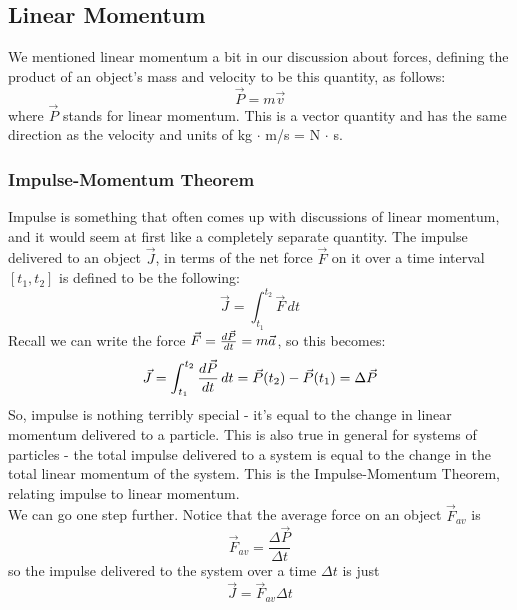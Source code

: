 \subsection{Linear Momentum}
We mentioned linear momentum a bit in our discussion about forces, defining the product of an object's mass and velocity to be this quantity, as follows: 
\[
	\vec P = m \vec v
\]
where $\vec P$ stands for linear momentum. This is a vector quantity and has the same direction as the velocity and units of kg $\cdot$ m/s = N $\cdot$ s. 
\subsubsection{Impulse-Momentum Theorem}
Impulse is something that often comes up with discussions of linear momentum, and it would seem at first like a completely separate quantity. The impulse delivered to an object $\vec J$, in terms of the net force $\vec F$ on it over a time interval $[t_1, t_2]$ is defined to be the following: 
\[
	\vec J = \int_{t_1}^{t_2} \vec F \, dt
\]
Recall we can write the force $\vec F = \frac{d \vec P}{d t} = m \vec a$, so this becomes:
\[
	\vec J = \int_{t_1}^{t_2} \frac{d \vec P}{d t} \, dt = \vec P(t_2) - \vec P(t_1) = \Delta \vec P
\]
So, impulse is nothing terribly special - it's equal to the change in linear momentum delivered to a particle. This is also true in general for systems of particles - the total impulse delivered to a system is equal to the change in the total linear momentum of the system. This is the Impulse-Momentum Theorem, relating impulse to linear momentum. \\
We can go one step further. Notice that the average force on an object $\vec F_{av}$ is
\[
	\vec F_{av} = \frac{\Delta \vec P}{\Delta t}
\]
so the impulse delivered to the system over a time $\Delta t$ is just 
\[
	\vec J = \vec F_{av} \Delta t
\]
